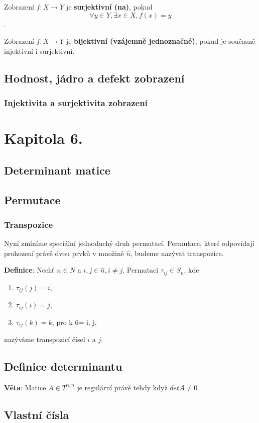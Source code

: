 \documentclass[12pt, letterpaper, twoside]{article}
\begin{document}
Zobrazení $f: X \to Y$ je \textbf{surjektivní (na)}, pokud
\[\forall y \in Y, \exists x \in X, f(x) = y\].

Zobrazení $f: X \to Y$ je \textbf{bijektivní (vzájemně jednoznačné)}, pokud
je současně injektivní i surjektivní.


\subsection{Hodnost, jádro a defekt zobrazení}
\subsubsection{Injektivita a surjektivita zobrazení}



\section{Kapitola 6.}
\subsection*{Determinant matice}

\subsection{Permutace}
\subsubsection{Transpozice}

Nyní zmíníme speciální jednoduchý druh permutací.
Permutace, které odpovídají prohození právě dvou prvků v množině $\hat{n}$, budeme nazývat transpozice.

\textbf{Definice}: Nechť $n \in N$ a $i, j \in \hat{n}, i \neq j$. Permutaci $\tau_{ij} \in S_{n}$, kde

\begin{enumerate}
    \item $\tau_{ij} (j) = i$,
    \item $\tau_{ij} (i) = j$,
    \item $\tau_{ij} (k) = k$, pro k 6= i, j,
\end{enumerate}

nazýváme transpozicí čísel $i$ a $j$.

\subsection{Definice determinantu}

\textbf{Věta}: Matice $A \in T^{n,n}$ je regulární právě tehdy když $detA ̈́\neq 0$


\subsection*{Vlastní čísla}
\end{document}

